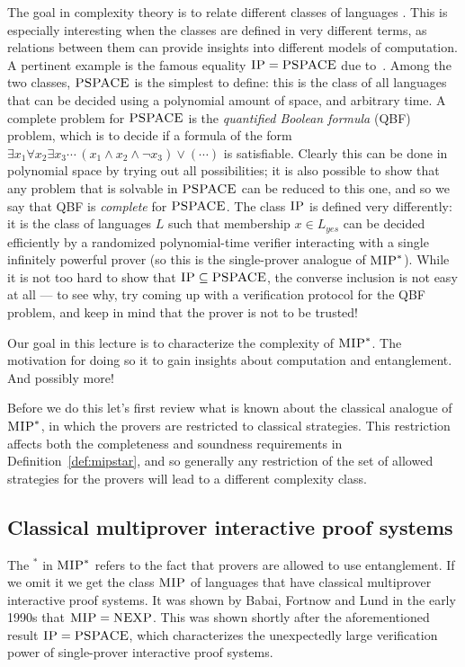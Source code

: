 \medskip

The goal in complexity theory is to relate different classes of languages . This is especially interesting when the classes are defined in very different terms, as relations between them can provide insights into different models of computation. A pertinent example is the famous equality $\textsc{IP} = \textsc{PSPACE}$ due to~\cite{lund1992algebraic,shamir1992ip}. Among the two classes, $\textsc{PSPACE}$ is the simplest to define: this is the class of all languages that can be decided using a polynomial amount of space, and arbitrary time. A complete problem for $\textsc{PSPACE}$ is the \emph{quantified Boolean formula} (QBF) problem, which is to decide if a formula of the form $\exists x_1 \forall x_2 \exists x_3\cdots  \, (x_1 \wedge x_2 \wedge \neg x_3) \vee (\cdots)$ is satisfiable. Clearly this can be done in polynomial space by trying out all possibilities; it is also possible to show that any problem that is solvable in $\textsc{PSPACE}$ can be reduced to this one, and so we say that QBF is \emph{complete} for $\textsc{PSPACE}$. The class $\textsc{IP}$ is defined very differently: it is the class of languages $L$ such that membership $x\in L_{yes}$ can be decided efficiently by a randomized polynomial-time verifier interacting with a single infinitely powerful prover (so this is the single-prover analogue of $\textsc{MIP}^*$).  While it is not too hard to show that $\textsc{IP} \subseteq \textsc{PSPACE}$, the converse inclusion is not easy at all --- to see why, try coming up with a verification protocol for the QBF problem, and keep in mind that the prover is not to be trusted!

Our goal in this lecture is to characterize the complexity of $\textsc{MIP}^*$. The motivation for doing so it to gain insights about computation and entanglement. And possibly more!

Before we do this let's first review what is known about the classical analogue of $\textsc{MIP}^*$, in which the provers are restricted to classical strategies.  This restriction affects both the completeness and soundness requirements in Definition~\ref{def:mipstar}, and so generally any restriction of the set of allowed strategies for the provers will lead to a different complexity class. 


\subsection{Classical multiprover interactive proof systems}
\label{sec:classical-mip}

The $^*$ in $\textsc{MIP}^*$ refers to the fact that provers are allowed to use entanglement. If we omit it we get the class $\textsc{MIP}$ of languages that have classical multiprover interactive proof systems. It was shown by Babai, Fortnow and Lund in the early 1990s that $\textsc{MIP} =  \textsc{NEXP}$. This was shown shortly after the aforementioned result $\textsc{IP} = \textsc{PSPACE}$, which characterizes the unexpectedly large verification power of single-prover interactive proof systems.  

